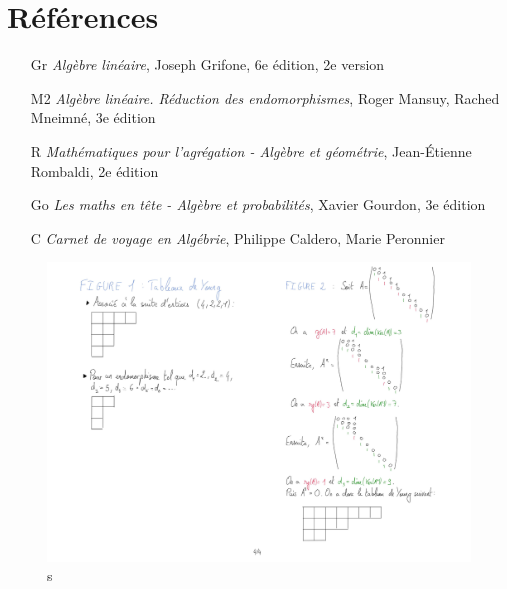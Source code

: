 \documentclass[10pt, a4paper, parskip=full, twoside, twocolumn]{report}
\begin{document}
\section*{Références}
\begin{itemize}
	\item[Gr] \emph{Algèbre linéaire}, Joseph Grifone, 6e édition, 2e version
	\item[M2] \emph{Algèbre linéaire. Réduction des endomorphismes}, Roger Mansuy, Rached Mneimné, 3e édition
	\item[R] \emph{Mathématiques pour l'agrégation - Algèbre et géométrie}, Jean-Étienne Rombaldi, 2e édition
	\item[Go] \emph{Les maths en tête - Algèbre et probabilités}, Xavier Gourdon, 3e édition
	\item[C] \emph{Carnet de voyage en Algébrie}, Philippe Caldero, Marie Peronnier
\end{itemize}
\begin{figure}[!htb]
	\centering
	\includegraphics[trim={0 0 0 0},clip,width=1\linewidth]{img/156.pdf}
	\caption{s}
\end{figure}


\end{document}

